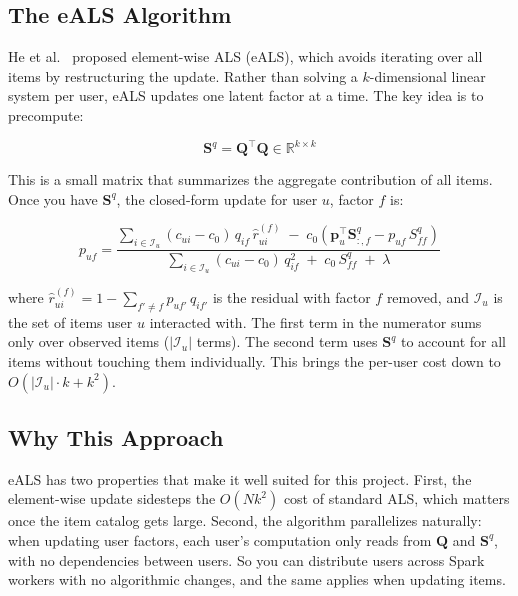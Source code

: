 \documentclass[11pt,a4paper]{article}
\begin{document}
\subsection{The eALS Algorithm}

He et al.~\cite{he2016} proposed element-wise ALS (eALS), which avoids iterating over all items by restructuring the update. Rather than solving a $k$-dimensional linear system per user, eALS updates one latent factor at a time. The key idea is to precompute:

\begin{equation}
\mathbf{S}^q = \mathbf{Q}^\top \mathbf{Q} \in \mathbb{R}^{k \times k}
\end{equation}

This is a small matrix that summarizes the aggregate contribution of all items. Once you have $\mathbf{S}^q$, the closed-form update for user $u$, factor $f$ is:

\begin{equation}
p_{uf} = \frac{\displaystyle\sum_{i \in \mathcal{I}_u} (c_{ui} - c_0)\, q_{if}\, \hat{r}_{ui}^{(f)} \;-\; c_0\left(\mathbf{p}_u^\top \mathbf{S}^q_{:,f} - p_{uf}\, S^q_{ff}\right)}{\displaystyle\sum_{i \in \mathcal{I}_u} (c_{ui} - c_0)\, q_{if}^2 \;+\; c_0\, S^q_{ff} \;+\; \lambda}
\label{eq:update}
\end{equation}

where $\hat{r}_{ui}^{(f)} = 1 - \sum_{f' \neq f} p_{uf'}\, q_{if'}$ is the residual with factor $f$ removed, and $\mathcal{I}_u$ is the set of items user $u$ interacted with. The first term in the numerator sums only over observed items ($|\mathcal{I}_u|$ terms). The second term uses $\mathbf{S}^q$ to account for all items without touching them individually. This brings the per-user cost down to $O(|\mathcal{I}_u| \cdot k + k^2)$.

\subsection{Why This Approach}

eALS has two properties that make it well suited for this project. First, the element-wise update sidesteps the $O(Nk^2)$ cost of standard ALS, which matters once the item catalog gets large. Second, the algorithm parallelizes naturally: when updating user factors, each user's computation only reads from $\mathbf{Q}$ and $\mathbf{S}^q$, with no dependencies between users. So you can distribute users across Spark workers with no algorithmic changes, and the same applies when updating items.
\end{document}
